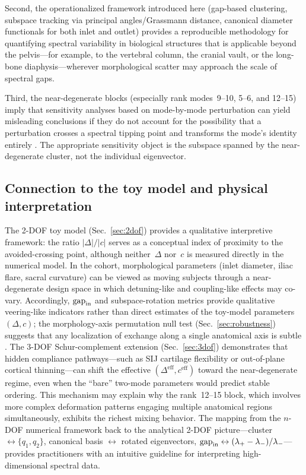 \documentclass[11pt]{article}
\begin{document}
Second, the operationalized framework introduced here (gap-based clustering, subspace tracking via principal angles/Grassmann distance, canonical diameter functionals for both inlet and outlet) provides a reproducible methodology for quantifying spectral variability in biological structures that is applicable beyond the pelvis---for example, to the vertebral column, the cranial vault, or the long-bone diaphysis---wherever morphological scatter may approach the scale of spectral gaps.

Third, the near-degenerate blocks (especially rank modes~9--10, 5--6, and 12--15) imply that sensitivity analyses based on mode-by-mode perturbation can yield misleading conclusions if they do not account for the possibility that a perturbation crosses a spectral tipping point and transforms the mode's identity entirely \citep{Pierre1988,Chen2019Veering}.
The appropriate sensitivity object is the subspace spanned by the near-degenerate cluster, not the individual eigenvector.

\subsection*{Connection to the toy model and physical interpretation}
The 2-DOF toy model (Sec.~\ref{sec:2dof}) provides a qualitative interpretive framework: the ratio $|\Delta|/|c|$ serves as a conceptual index of proximity to the avoided-crossing point, although neither~$\Delta$ nor~$c$ is measured directly in the numerical model.
In the cohort, morphological parameters (inlet diameter, iliac flare, sacral curvature) can be viewed as moving subjects through a near-degenerate design space in which detuning-like and coupling-like effects may co-vary.
Accordingly, $\mathrm{gap}_{\rm in}$ and subspace-rotation metrics provide qualitative veering-like indicators rather than direct estimates of the toy-model parameters $(\Delta,c)$; the morphology-axis permutation null test (Sec.~\ref{sec:robustness}) suggests that any localization of exchange along a single anatomical axis is subtle \citep{Ruff2017,Betti2020,Weber2019,Whitcome2017}.
The 3-DOF Schur-complement extension (Sec.~\ref{sec:3dof}) demonstrates that hidden compliance pathways---such as SIJ cartilage flexibility or out-of-plane cortical thinning---can shift the effective $(\Delta^{\mathrm{eff}}, c^{\mathrm{eff}})$ toward the near-degenerate regime, even when the ``bare'' two-mode parameters would predict stable ordering.
This mechanism may explain why the rank~12--15 block, which involves more complex deformation patterns engaging multiple anatomical regions simultaneously, exhibits the richest mixing behavior.
The mapping from the $n$-DOF numerical framework back to the analytical 2-DOF picture---cluster $\leftrightarrow\{q_1,q_2\}$, canonical basis $\leftrightarrow$ rotated eigenvectors, $\mathrm{gap}_{\rm in}\leftrightarrow (\lambda_+-\lambda_-)/\lambda_-$---provides practitioners with an intuitive guideline for interpreting high-dimensional spectral data.
\end{document}
